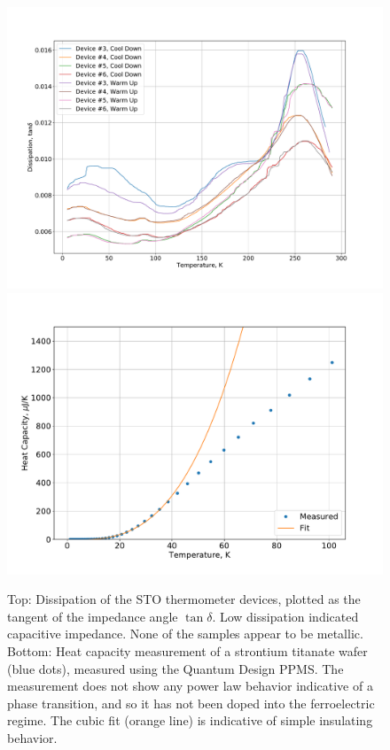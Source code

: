 \documentclass{thesis-umich}
\begin{document}
\begin{figure} \caption[Annealed STO Heat Capacity]{Top: Dissipation of the STO thermometer devices, plotted as the tangent of the impedance angle $\tan \delta$. Low dissipation indicated capacitive impedance. None of the samples appear to be metallic. Bottom: Heat capacity measurement of a strontium titanate wafer
(blue dots), measured using the Quantum Design PPMS. The measurement does not
show any power law behavior indicative of a phase transition, and so it has not
been doped into the ferroelectric regime. The cubic fit (orange line) is
indicative of simple insulating behavior.}
\label{fig:annealed_sto_repro_2}
\includegraphics[width=0.9\columnwidth]{figures/annealed_sto_diss_vs_t.pdf}
\includegraphics[width=0.9\columnwidth]{figures/annealed_sto_heatcap_vs_t.pdf}
\end{figure}
\end{document}
